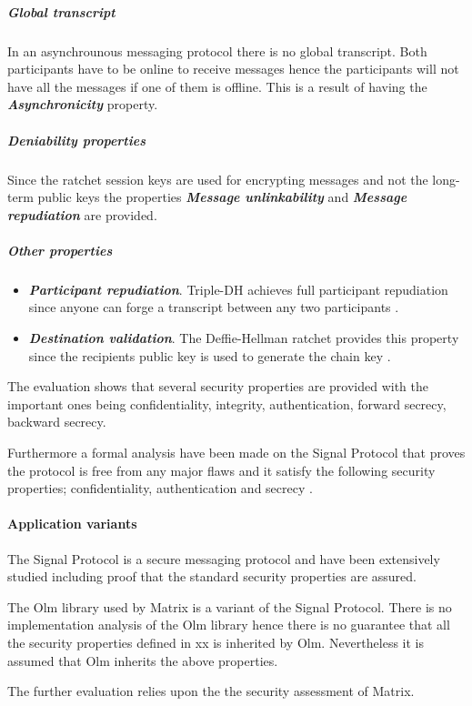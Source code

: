 \subparagraph{Global transcript} 
In an asynchrounous messaging protocol there is no global transcript. Both participants have to be online to receive messages hence the participants will not have all the messages if one of them is offline. This is a result of having the \textbf{\emph{Asynchronicity}} property.

\subparagraph{Deniability properties}

Since the ratchet session keys are used for encrypting messages and not the long-term public keys the properties \textbf{\emph{Message unlinkability}} and \textbf{\emph{Message repudiation}} are provided. 


\subparagraph{Other properties}

\begin{itemize}
	\item \textbf{\emph{Participant repudiation}}. Triple-DH achieves full participant repudiation since anyone can forge a transcript between any two participants \cite{sok}.
	\item \textbf{\emph{Destination validation}}. The Deffie-Hellman ratchet provides this property since the recipients public key is used to generate the chain key \cite{sok}. %
\end{itemize}


The evaluation shows that several security properties are provided with the important ones being confidentiality, integrity, authentication, forward secrecy, backward secrecy. 

Furthermore a formal analysis have been made on the Signal Protocol that proves the protocol is free from any major flaws and it satisfy the following security properties; confidentiality, authentication and secrecy \cite{Signal}. 

\paragraph{Application variants}

The Signal Protocol is a secure messaging protocol and have been extensively studied including proof that the standard security properties are assured. 

The Olm library used by Matrix is a variant of the Signal Protocol. There is no implementation analysis of the Olm library hence there is no guarantee that all the security properties defined in xx is inherited by Olm. Nevertheless it is assumed that Olm inherits the above properties.

The further evaluation relies upon the the security assessment of Matrix. 


